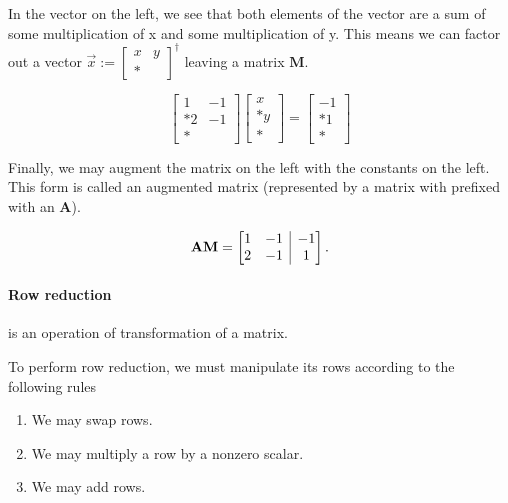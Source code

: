 \documentclass{article}
\begin{document}
In the vector on the left, we see that both elements of the vector are a sum of some multiplication of x and some multiplication of y. This means we can factor out a vector $\vec{x} := \left[\begin{matrix} x & y \\* \end{matrix}\right]^\dagger$ leaving a matrix $\mathbf{M}$.

\begin{equation}\label{eq:linear system 1 matrix}
    \left[
        \begin{matrix}
            1 & -1 \\*
            2 & -1 \\*
        \end{matrix}
    \right]\!\left[
        \begin{matrix}
            x \\*
            y \\*
        \end{matrix}
    \right] = \left[
        \begin{matrix}
            -1 \\*
            1 \\*
        \end{matrix}
    \right]
\end{equation}

Finally, we may augment the matrix on the left with the constants on the left. This form is called an augmented matrix (represented by a matrix with prefixed with an $\mathbf{A}$).

\begin{equation}\label{eq:linear system 1 matrix augmented}
    \mathbf{AM} = \left[
        \begin{array}{@{}*2c|c@{}}
            1 & -1 & -1 \\*
            2 & -1 & 1 \\*
        \end{array}
    \right].
\end{equation}

\paragraph{Row reduction} is an operation of transformation of a matrix. 

To perform row reduction,
we must manipulate its rows according to the following rules
\begin{enumerate}
    \item We may swap rows.
    \item We may multiply a row by a nonzero scalar.
    \item We may add rows.
\end{enumerate}
\end{document}
